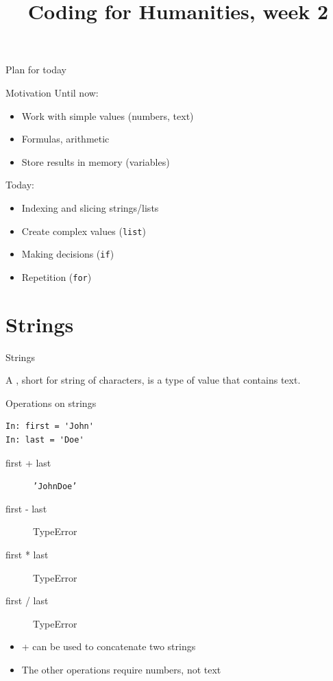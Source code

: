 \documentclass[aspectratio=169,usenames,dvipsnames]{beamer}
\title{Coding for Humanities, week 2}
\begin{document}
\begin{frame}
    \titlepage
\end{frame}

\begin{frame}{Plan for today}
    \tableofcontents
\end{frame}

\begin{frame}{Motivation}
    Until now:
    \begin{itemize}
        \item Work with simple values (numbers, text)
        \item Formulas, arithmetic
        \item Store results in memory (variables)
    \end{itemize}

    \pause
    Today:
    \begin{itemize}
        \item Indexing and slicing strings/lists
        \item Create complex values (\texttt{list})
        \item Making decisions (\texttt{if})
        \item Repetition (\texttt{for})
    \end{itemize}
\end{frame}

\section{Strings}
\frame{\tableofcontents[currentsection]}

\begin{frame}{Strings}
    \begin{definition}
        A , short for string of characters,
        is a type of value that contains text.
    \end{definition}

\end{frame}

\begin{frame}[fragile]{Operations on strings}
\begin{lstlisting}
In: first = 'John'
In: last = 'Doe'
\end{lstlisting}
\begin{description}
    \item[first + last] \texttt{'JohnDoe'}
    \item[first - last] TypeError
    \item[first * last] TypeError
    \item[first / last] TypeError
\end{description}

\begin{itemize}
\item + can be used to concatenate two strings
\item The other operations require numbers, not text
\end{itemize}
\end{frame}
\end{document}

